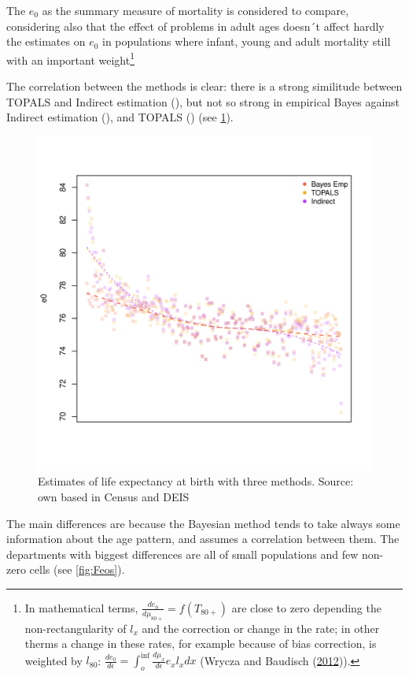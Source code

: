 \documentclass[12pt,]{article}
\begin{document}
The \(e_0\) as the summary measure of mortality is considered to
compare, considering also that the effect of problems in adult ages
doesn´t affect hardly the estimates on \(e_0\) in populations where
infant, young and adult mortality still with an important
weight\footnote{In mathematical terms,
  \(\frac{de_0}{d\mu_{80+}}=f(T_{80+})\) are close to zero depending the
  non-rectangularity of \(l_x\) and the correction or change in the
  rate; in other therms a change in these rates, for example because of
  bias correction, is weighted by \(l_80\):
  \(\frac{de_0}{d\epsilon}=\int_{o}^{\inf}{\frac{d\mu_x}{d\epsilon}e_x l_x dx}\)
  (Wrycza and Baudisch (\protect\hyperlink{ref-Wrycza2012}{2012})).}

The correlation between the methods is clear: there is a strong
similitude between TOPALS and Indirect estimation (), but not so strong
in empirical Bayes against Indirect estimation (), and TOPALS () (see
\ref{fig:comparativeMeth}).

\begin{figure}

{\centering \includegraphics[width=0.7\linewidth]{analysis/plots/CompMethods} 

}

\caption{Estimates of life expectancy at birth with three methods. Source: own based in Census and DEIS}\label{fig:comparativeMeth}
\end{figure}

The main differences are because the Bayesian method tends to take
always some information about the age pattern, and assumes a correlation
between them. The departments with biggest differences are all of small
populations and few non-zero cells (see \ref{fig:Feos}).
\end{document}
